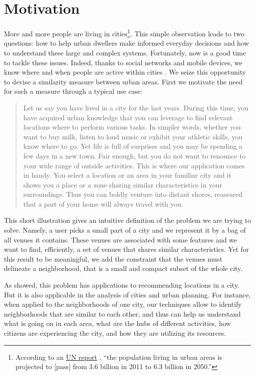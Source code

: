 \section{Motivation}
\label{sec:motivation}

More and more people are living in cities\footnote{According to an
\href{http://esa.un.org/unup/pdf/WUP2011_Highlights.pdf}{UN report}
\autocite{UNreport12}, \enquote{the population living in urban areas is
projected to [pass] from 3.6 billion in 2011 to 6.3 billion in 2050.}}. This
simple observation leads to two questions: how to help urban dwellers make
informed everyday decisions and how to understand these large and complex
systems. Fortunately, now is a good time to tackle these issues. Indeed, thanks
to social networks and mobile devices, we know where and when people are
active within cities \autocite{SpatialComputing12}. We seize this opportunity
to devise a similarity measure between urban areas. First we motivate the
need for such a measure through a typical use case:

\begin{quote}
Let us say you have lived in a city for the last years. During this time,
you have acquired urban knowledge that you can leverage to find relevant
locations where to perform various tasks. In simpler words, whether you want
to buy milk, listen to loud music or exhibit your athletic skills, you know
where to go. Yet life is full of surprises and you may be spending a few
days in a new town. Fair enough, but you do not want to renounce to your
wide range of outside activities. This is where our application comes in
handy. You select a location or an area in your familiar city and it shows
you a place or a zone sharing similar characteristics in your surroundings.
Thus you can boldly venture into distant shores, reassured that a part of
your home will always travel with you.
\end{quote}

This short illustration gives an intuitive definition of the problem we are
trying to solve. Namely, a user picks a small part of a city and we represent
it by a bag of all venues it contains. These venues are associated with some
features and we want to find, efficiently, a set of venues that shares similar
characteristics. Yet for this result to be meaningful, we add the constraint
that the venues must delineate a neighborhood, that is a small and compact
subset of the whole city.

As showed, this problem has applications to recommending locations in a city.
But it is also applicable in the analysis of cities and urban planning. For
instance, when applied to the neighborhoods of one city, our techniques allow
to identify neighborhoods that are similar to each other, and thus can help us
understand what is going on in each area, what are the hubs of different
activities, how citizens are experiencing the city, and how they are utilizing
its resources. 

